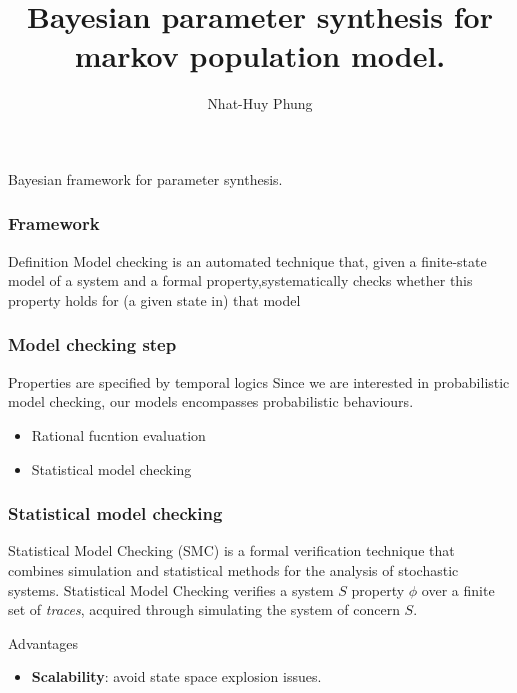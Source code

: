 \documentclass{beamer}
\title{Bayesian parameter synthesis for markov population model.}
\author{Nhat-Huy Phung}
\institute{University of Konstanz}
\begin{document}
\frame{\titlepage}

\begin{frame}
    \begin{center}
        \Huge Bayesian framework for parameter synthesis.
    \end{center}
\end{frame}

\begin{frame}
    \frametitle{Framework}
    \begin{block}{Definition}
        Model checking is an automated technique that, given a finite-state model of a system and a formal property,systematically checks whether this property holds for (a given state in) that model
    \end{block}

\end{frame}


\begin{frame}
    \frametitle{Model checking step}
    Properties are specified by temporal logics
    Since we are interested in probabilistic model checking, our models encompasses probabilistic behaviours.
    \begin{examples}
        \begin{itemize}
            \item Rational fucntion evaluation
            \item Statistical model checking
        \end{itemize}
    \end{examples}
\end{frame}

\begin{frame}
    \frametitle{Statistical model checking}
    Statistical Model Checking (SMC) is a formal verification technique that combines simulation and statistical methods for the analysis of stochastic systems. \footnotemark[1] Statistical Model Checking verifies a system $S$ property $\phi$ over a finite set of \textit{traces}, acquired through simulating the system of concern $S$.
    \begin{block}{Advantages}
        \begin{itemize}
            \item \textbf{Scalability}: avoid state space explosion issues.
        \end{itemize}
    \end{block}
\end{frame}
\end{document}

